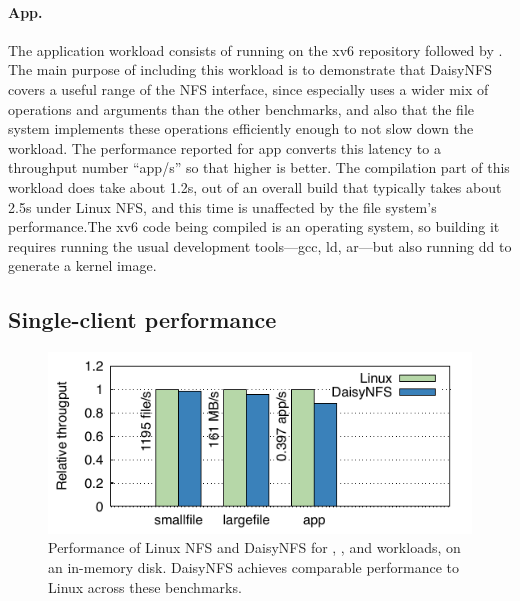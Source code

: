 \paragraph{App.}
The application workload  consists of running  on the xv6
repository followed by . The main purpose of including this workload is to
demonstrate that DaisyNFS covers a useful range of the NFS interface, since
 especially uses a wider mix of operations and arguments than the
other benchmarks, and also that the file system implements these operations
efficiently enough to not slow down the workload. The performance reported for
app converts this latency to a throughput number ``app/s'' so that higher is
better. The compilation part of this workload does take about 1.2s, out of an
overall build that typically takes about 2.5s under Linux NFS, and this time is
unaffected by the file system's performance.\@ The xv6 code being compiled is an
operating system, so building it requires running the usual development
tools---gcc, ld, ar---but also running dd to generate a kernel image.

\subsection{Single-client performance}



\begin{figure}[ht]
  \centering
  \includegraphics{daisy-nfs/fig/bench.pdf}
  \caption[Performance for smallfile, largefile, and app benchmarks]%
  {Performance of Linux NFS and DaisyNFS for ,
    , and  workloads, on an in-memory disk.
    DaisyNFS achieves comparable performance to Linux across these benchmarks.}
  \label{fig:eval:bench}
\end{figure}


